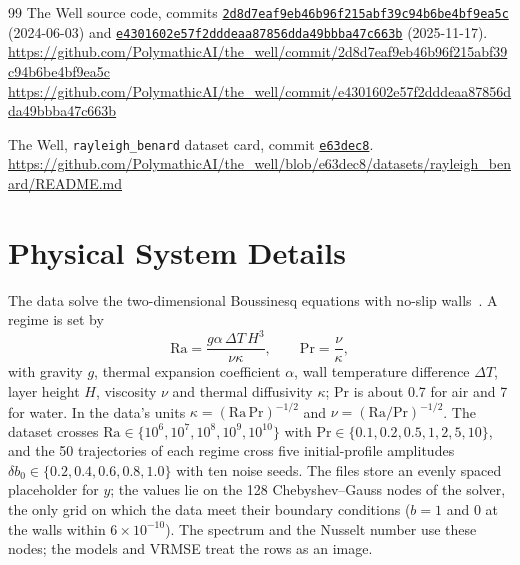 \documentclass[11pt]{article}
\providecommand{\appendixcontents}{}
\begin{document}
\begin{thebibliography}{99}
The Well source code, commits
\href{https://github.com/PolymathicAI/the_well/commit/2d8d7eaf9eb46b96f215abf39c94b6be4bf9ea5c}{\texttt{2d8d7eaf9eb46b96f215abf39c94b6be4bf9ea5c}}
(2024-06-03) and
\href{https://github.com/PolymathicAI/the_well/commit/e4301602e57f2dddeaa87856dda49bbba47c663b}{\texttt{e4301602e57f2dddeaa87856dda49bbba47c663b}}
(2025-11-17).\\
\url{https://github.com/PolymathicAI/the_well/commit/2d8d7eaf9eb46b96f215abf39c94b6be4bf9ea5c}\\
\url{https://github.com/PolymathicAI/the_well/commit/e4301602e57f2dddeaa87856dda49bbba47c663b}

The Well, \texttt{rayleigh\_benard} dataset card, commit
\href{https://github.com/PolymathicAI/the_well/commit/e63dec8ded515be864755eaf595d39fea409e335}{\texttt{e63dec8}}.\\
\url{https://github.com/PolymathicAI/the_well/blob/e63dec8/datasets/rayleigh_benard/README.md}

\end{thebibliography}

\clearpage
\appendix
\addtocontents{toc}{\protect\appendixcontents}
\makeatletter
\renewcommand{\@seccntformat}[1]{\ifcsname prefix@#1\endcsname\csname prefix@#1\endcsname\fi
  \csname the#1\endcsname\ifcsname prefix@#1\endcsname:\fi\quad}
\newcommand{\prefix@section}{Appendix~}
\makeatother

\section{Physical System Details}
\label{app:rb_regimes}

The data solve the two-dimensional Boussinesq equations with no-slip walls~\cite{wellrb}. A regime is set by
\begin{equation}
    \mathrm{Ra} = \frac{g\alpha\,\Delta T\,H^3}{\nu\kappa}, \qquad \mathrm{Pr} = \frac{\nu}{\kappa},
\end{equation}
with gravity $g$, thermal expansion coefficient $\alpha$, wall temperature difference $\Delta T$, layer height $H$,
viscosity $\nu$ and thermal diffusivity $\kappa$; $\mathrm{Pr}$ is about 0.7 for air and 7 for water. In the data's
units $\kappa=(\mathrm{Ra}\,\mathrm{Pr})^{-1/2}$ and $\nu=(\mathrm{Ra}/\mathrm{Pr})^{-1/2}$. The dataset crosses
$\mathrm{Ra}\in\{10^6,10^7,10^8,10^9,10^{10}\}$ with $\mathrm{Pr}\in\{0.1,0.2,0.5,1,2,5,10\}$, and the 50
trajectories of each regime cross five initial-profile amplitudes $\delta b_0\in\{0.2,0.4,0.6,0.8,1.0\}$ with ten
noise seeds. The files store an evenly spaced placeholder for $y$; the values lie on the 128 Chebyshev--Gauss nodes
of the solver, the only grid on which the data meet their boundary conditions ($b=1$ and 0 at the walls within
$6\times10^{-10}$). The spectrum and the Nusselt number use these nodes; the models and VRMSE treat the rows as an
image.
\end{document}
